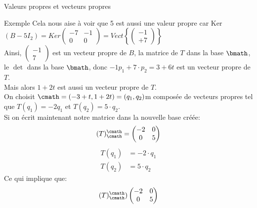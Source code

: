 \begin{parag}{Valeurs propres et vecteurs propres}
\begin{subparag}{Exemple}
        Cela nous aise à voir que 5 est aussi une valeur propre car Ker$(B - 5I_2) = Ker \begin{pmatrix}
            -7 & -1 \\ 0 & 0
        \end{pmatrix} = Vect\left\{\begin{pmatrix}
            -1 \\ +7
        \end{pmatrix}\right\}$\\
        Ainsi, $\begin{pmatrix}
            -1 \\ 7
        \end{pmatrix}$ est un vecteur propre de $B$, la matrice de $T$ dans la base $\bmath$, le $\det$ dans la base $\bmath$, donc $-1p_1 + 7\cdot p_2 = 3 +  6t$ est un vecteur propre de $T$.\\
        Mais alors $1 + 2t$ est aussi un vecteur propre de $T$.
        \\
        On choisit $\cmath = (-3 + t, 1 + 2t) = (q_1, q_2)$m composée de vecteurs propres tel que $T(q_1) = -2q_1$ et $T(q_2) = 5\cdot q_2$.
        \\
        Si on écrit maintenant notre matrice dans la nouvelle base créée:
        \[(T)_\cmath^\cmath = \begin{pmatrix}
            -2  & 0 \\ 0 & 5
        \end{pmatrix}\]
        \begin{align*}
            T(q_1) &= -2\cdot q_1\\
            T(q_2) &= 5\cdot q_2
        \end{align*}
        Ce qui implique que:
        \[(T)_\cmath^\cmath ) \begin{pmatrix}
            -2 & 0 \\ 0 & 5
        \end{pmatrix}\]
    \end{subparag}
    \end{parag}     

